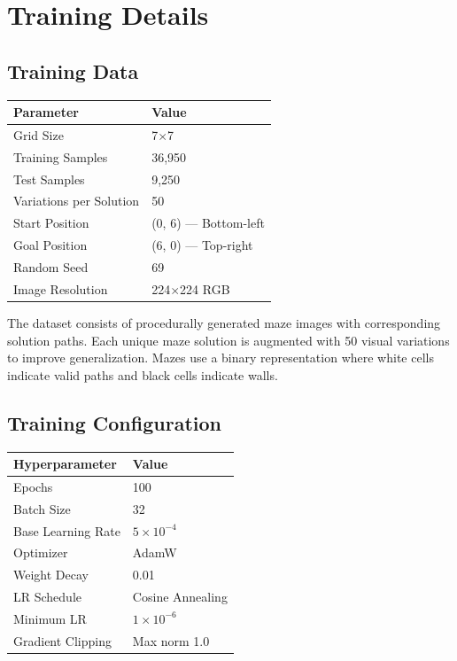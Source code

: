\documentclass[11pt,a4paper]{article}
\begin{document}
\section{Training Details}

\subsection{Training Data}

\begin{center}
\begin{tabular}{ll}
\toprule
\textbf{Parameter} & \textbf{Value} \\
\midrule
Grid Size & 7$\times$7 \\
Training Samples & 36,950 \\
Test Samples & 9,250 \\
Variations per Solution & 50 \\
Start Position & (0, 6) --- Bottom-left \\
Goal Position & (6, 0) --- Top-right \\
Random Seed & 69 \\
Image Resolution & 224$\times$224 RGB \\
\bottomrule
\end{tabular}
\end{center}

The dataset consists of procedurally generated maze images with corresponding solution paths. Each unique maze solution is augmented with 50 visual variations to improve generalization. Mazes use a binary representation where white cells indicate valid paths and black cells indicate walls.

\subsection{Training Configuration}

\begin{center}
\begin{tabular}{ll}
\toprule
\textbf{Hyperparameter} & \textbf{Value} \\
\midrule
Epochs & 100 \\
Batch Size & 32 \\
Base Learning Rate & $5 \times 10^{-4}$ \\
Optimizer & AdamW \\
Weight Decay & 0.01 \\
LR Schedule & Cosine Annealing \\
Minimum LR & $1 \times 10^{-6}$ \\
Gradient Clipping & Max norm 1.0 \\
\bottomrule
\end{tabular}
\end{center}
\end{document}
